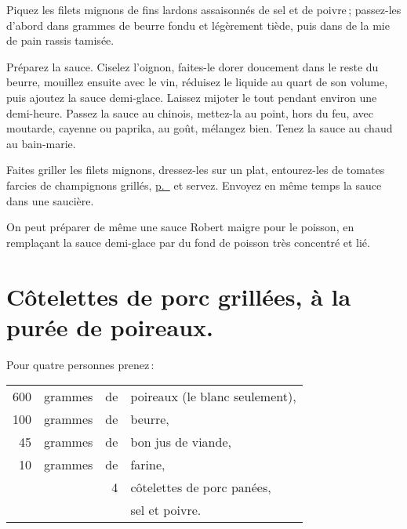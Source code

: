 Piquez les filets mignons de fins lardons assaisonnés de sel et de poivre ;
passez-les d'abord dans {\mmm} grammes de beurre fondu et légèrement tiède, puis
dans de la mie de pain rassis tamisée.

Préparez la sauce. Ciselez l'oignon, faites-le dorer doucement dans le reste du
beurre, mouillez ensuite avec le vin, réduisez le liquide au quart de son
volume, puis ajoutez la sauce demi-glace. Laissez mijoter le tout pendant
environ une demi-heure. Passez la sauce au chinois, mettez-la au point, hors du
feu, avec moutarde, cayenne ou paprika, au goût, mélangez bien. Tenez la sauce
au chaud au bain-marie.

Faites griller les filets mignons, dressez-les sur un plat, entourez-les de
{\mmm} tomates farcies de champignons grillés,
\hyperlink{p0766}{p. \pageref{pg0766}} et servez. Envoyez en même temps la sauce
dans une saucière.

\sk

On peut préparer de même une sauce Robert maigre pour le poisson, en remplaçant
la sauce demi-glace par du fond de poisson très concentré et lié.

\section*{\centering Côtelettes de porc grillées, à la purée de poireaux.}
{}

Pour quatre personnes prenez :

\medskip

\footnotesize
\begin{longtable}{rrrp{16em}}
    600 & grammes & de & poireaux (le blanc seulement),                                                   \\
    100 & grammes & de & beurre,                                                                          \\
     45 & grammes & de & bon jus de viande,                                                               \\
     10 & grammes & de & farine,                                                                          \\
        &         &  4 & côtelettes de porc panées,                                                       \\
        &         &    & sel et poivre.                                                                   \\
\end{longtable}
\normalsize

